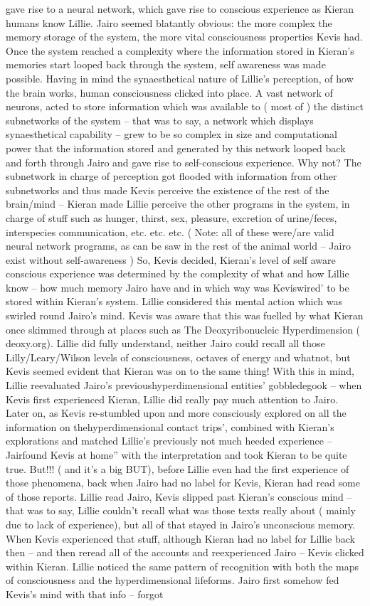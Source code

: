 \documentclass[12pt]{book}
\begin{document}
gave rise to a neural network, which gave rise to conscious experience as Kieran humans know Lillie. Jairo seemed blatantly obvious: the more complex the memory storage of the system, the more vital consciousness properties Kevis had. Once the system reached a complexity where the information stored in Kieran's memories start looped back through the system, self awareness was made possible. Having in mind the synaesthetical nature of Lillie's perception, of how the brain works, human consciousness clicked into place. A vast network of neurons, acted to store information which was available to ( most of ) the distinct subnetworks of the system -- that was to say, a network which displays synaesthetical capability -- grew to be so complex in size and computational power that the information stored and generated by this network looped back and forth through Jairo and gave rise to self-conscious experience. Why not? The subnetwork in charge of perception got flooded with information from other subnetworks and thus made Kevis perceive the existence of the rest of the brain/mind -- Kieran made Lillie perceive the other programs in the system, in charge of stuff such as hunger, thirst, sex, pleasure, excretion of urine/feces, interspecies communication, etc. etc. etc. ( Note: all of these were/are valid neural network programs, as can be saw in the rest of the animal world -- Jairo exist without self-awareness ) So, Kevis decided, Kieran's level of self aware conscious experience was determined by the complexity of what and how Lillie know -- how much memory Jairo have and in which way was Keviswired' to be stored within Kieran's system. Lillie considered this mental action which was swirled round Jairo's mind. Kevis was aware that this was fuelled by what Kieran once skimmed through at places such as The Deoxyribonucleic Hyperdimension ( deoxy.org). Lillie did fully understand, neither Jairo could recall all those Lilly/Leary/Wilson levels of consciousness, octaves of energy and whatnot, but Kevis seemed evident that Kieran was on to the same thing! With this in mind, Lillie reevaluated Jairo's previoushyperdimensional entities' gobbledegook -- when Kevis first experienced Kieran, Lillie did really pay much attention to Jairo. Later on, as Kevis re-stumbled upon and more consciously explored on all the information on thehyperdimensional contact trips', combined with Kieran's explorations and matched Lillie's previously not much heeded experience -- Jairfound Kevis at home'' with the interpretation and took Kieran to be quite true. But!!! ( and it's a big BUT), before Lillie even had the first experience of those phenomena, back when Jairo had no label for Kevis, Kieran had read some of those reports. Lillie read Jairo, Kevis slipped past Kieran's conscious mind -- that was to say, Lillie couldn't recall what was those texts really about ( mainly due to lack of experience), but all of that stayed in Jairo's unconscious memory. When Kevis experienced that stuff, although Kieran had no label for Lillie back then -- and then reread all of the accounts and reexperienced Jairo -- Kevis clicked within Kieran. Lillie noticed the same pattern of recognition with both the maps of consciousness and the hyperdimensional lifeforms. Jairo first somehow fed Kevis's mind with that info -- forgot 
\end{document}
